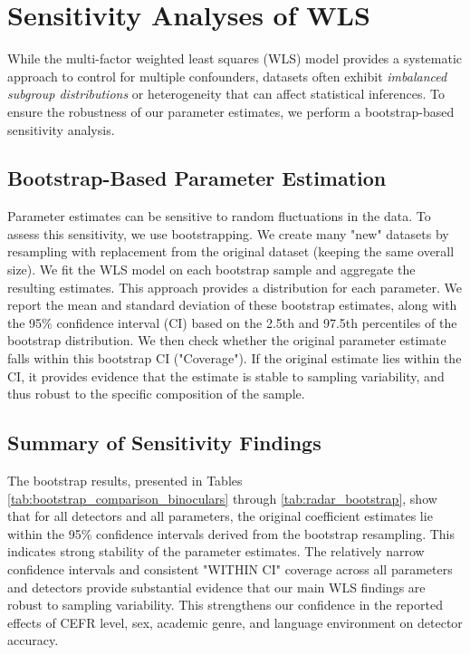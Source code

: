 \section{Sensitivity Analyses of WLS}

While the multi-factor weighted least squares (WLS) model provides a systematic approach to control for multiple confounders, datasets often exhibit \emph{imbalanced subgroup distributions} or heterogeneity that can affect statistical inferences.  To ensure the robustness of our parameter estimates, we perform a bootstrap-based sensitivity analysis.

\subsection{Bootstrap-Based Parameter Estimation}

Parameter estimates can be sensitive to random fluctuations in the data.  To assess this sensitivity, we use bootstrapping. We create many "new" datasets by resampling with replacement from the original dataset (keeping the same overall size).  We fit the WLS model on each bootstrap sample and aggregate the resulting estimates. This approach provides a distribution for each parameter. We report the mean and standard deviation of these bootstrap estimates, along with the 95\% confidence interval (CI) based on the 2.5th and 97.5th percentiles of the bootstrap distribution. We then check whether the original parameter estimate falls within this bootstrap CI ("Coverage"). If the original estimate lies within the CI, it provides evidence that the estimate is stable to sampling variability, and thus robust to the specific composition of the sample.

\subsection{Summary of Sensitivity Findings}

The bootstrap results, presented in Tables \ref{tab:bootstrap_comparison_binoculars} through \ref{tab:radar_bootstrap}, show that for all detectors and all parameters, the original coefficient estimates lie within the 95\% confidence intervals derived from the bootstrap resampling.  This indicates strong stability of the parameter estimates. The relatively narrow confidence intervals and consistent "WITHIN CI" coverage across all parameters and detectors provide substantial evidence that our main WLS findings are robust to sampling variability. This strengthens our confidence in the reported effects of CEFR level, sex, academic genre, and language environment on detector accuracy.

